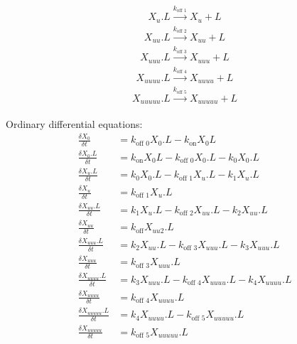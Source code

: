 \documentclass[11pt]{article}
\begin{document}
\begin{equation}
  X_u.L \xrightarrow[]{k_\text{off 1}} X_{u} + L
\end{equation}
\begin{equation}
  X_{uu}.L \xrightarrow[]{k_\text{off 2}} X_{uu} + L
\end{equation}
\begin{equation}
  X_{uuu}.L \xrightarrow[]{k_\text{off 3}} X_{uuu} + L
\end{equation}
\begin{equation}
  X_{uuuu}.L \xrightarrow[]{k_\text{off 4}} X_{uuuu} + L
\end{equation}
\begin{equation}
  X_{uuuuu}.L \xrightarrow[]{k_\text{off 5}} X_{uuuuu} + L
\end{equation}

Ordinary differential equations:
\begin{align}
  \frac{\delta X_0}{\delta t} &= k_\text{off 0} X_0.L - k_\text{on} X_0 L\\
  \frac{\delta X_{0}.L}{\delta t} &= k_\text{on} X_0 L - k_\text{off 0} X_0.L - k_0 X_0.L\\
  \frac{\delta X_{u}.L}{\delta t} &= k_0 X_{0}.L - k_\text{off 1} X_{u}.L - k_1 X_{u}.L\\
  \frac{\delta X_{u}}{\delta t} &= k_\text{off 1} X_{u}.L\\
  \frac{\delta X_{uu}.L}{\delta t} &= k_1 X_{u}.L - k_\text{off 2} X_{uu}.L - k_2 X_{uu}.L\\
  \frac{\delta X_{uu}}{\delta t} &= k_\text{off} X_{uu 2}.L\\
  \frac{\delta X_{uuu}.L}{\delta t} &= k_2 X_{uu}.L - k_\text{off 3} X_{uuu}.L - k_3 X_{uuu}.L\\
  \frac{\delta X_{uuu}}{\delta t} &= k_\text{off 3} X_{uuu}.L\\
  \frac{\delta X_{uuuu}.L}{\delta t} &= k_3 X_{uuu}.L - k_\text{off 4} X_{uuuu}.L - k_4 X_{uuuu}.L\\
  \frac{\delta X_{uuuu}}{\delta t} &= k_\text{off 4} X_{uuuu}.L\\
  \frac{\delta X_{uuuuu}.L}{\delta t} &= k_4 X_{uuuu}.L - k_\text{off 5} X_{uuuuu}.L\\
  \frac{\delta X_{uuuuu}}{\delta t} &= k_\text{off 5} X_{uuuuu}.L
\end{align}
\end{document}

